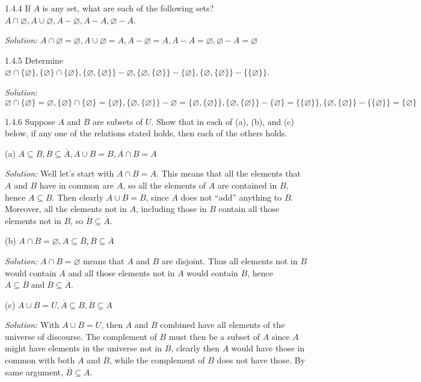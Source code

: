 \documentclass{letter}
\newcommand{\tmop}[1]{\ensuremath{\operatorname{#1}}}
\newcommand{\tmtextit}[1]{{\itshape{#1}}}
\begin{document}
1.4.4 If $A$ is any set, what are each of the following sets? $A \cap
\varnothing, A \cup \varnothing, A - \varnothing, A - A, \varnothing - A$.

\tmtextit{Solution:} $A \cap \varnothing = \varnothing, A \cup \varnothing =
A, A - \varnothing = A, A - A = \varnothing, \varnothing - A = \varnothing$

1.4.5 Determine $\varnothing \cap \{\varnothing\}, \{\varnothing\} \cap
\{\varnothing\}, \{\varnothing, \{\varnothing\}\}- \varnothing, \{\varnothing,
\{\varnothing\}\}-\{\varnothing\}, \{\varnothing,
\{\varnothing\}\}-\{\{\varnothing\}\}$.

\tmtextit{Solution:} $\varnothing \cap \{\varnothing\}= \varnothing,
\{\varnothing\} \cap \{\varnothing\}=\{\varnothing\}, \{\varnothing,
\{\varnothing\}\}- \varnothing =\{\varnothing, \{\varnothing\}\},
\{\varnothing, \{\varnothing\}\}-\{\varnothing\}=\{\{\varnothing\}\},
\{\varnothing, \{\varnothing\}\}-\{\{\varnothing\}\}=\{\varnothing\}$

1.4.6 Suppose $A$ and $B$ are subsets of $U$. Show that in each of (a), (b),
and (c) below, if any one of the relations stated holds, then each of the
others holds.

(a) $A \subseteq B, \overline{B} \subseteq \overline{A}, A \cup B = B, A \cap
B = A$

\tmtextit{Solution:} Well let's start with $A \cap B = A$. This means that all
the elements that $A$ and $B$ have in common are $A$, so all the elements of
$A$ are contained in $B$, hence $A \subseteq B$. Then clearly $A \cup B = B$,
since $A$ does not ``add'' anything to $B$. Moreover, all the elements not in
$A$, including those in $B$ contain all those elements not in $B$, so
$\overline{B} \subseteq \overline{A}$.

(b) $A \cap B = \varnothing, A \subseteq \overline{B}, B \subseteq
\overline{A}$

\tmtextit{Solution:} $A \cap B = \varnothing$ means that $A$ and $B$ are
disjoint. Thus all elements not in $B$ would contain $A$ and all those
elements not in $A$ would contain $B$, hence $A \subseteq \overline{B}
\tmop{and} B \subseteq \overline{A}$.

(c) $A \cup B = U, \overline{A} \subseteq B, \overline{B} \subseteq A$

\tmtextit{Solution:} With $A \cup B = U$, then $A$ and $B$ combined have all
elements of the universe of discourse. The complement of $B$ must then be a
subset of $A$ since $A$ might have elements in the universe not in $B$,
clearly then $A$ would have those in common with both $A$ and $B$, while the
complement of $B$ does not have those. By same argument, $\overline{B}
\subseteq A$.
\end{document}
